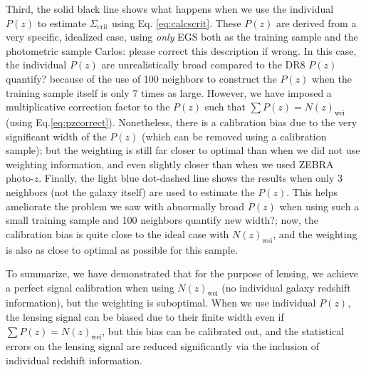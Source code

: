 \documentclass[preprint]{aastex}
\begin{document}
Third, the solid black line shows what happens when we use the individual
$P(z)$ to estimate $\Sigma_\mathrm{crit}$ using Eq. \ref{eq:calcscrit}.  These
$P(z)$ are derived from a very specific, idealized case, using {\em only} EGS
both as the training sample and the photometric sample {\color{red} Carlos:
please correct this description if wrong}.  In this case, the individual $P(z)$
are unrealistically broad compared to the DR8 $P(z)$ {\color{red}quantify?}
because of the use of 100 neighbors to construct the $P(z)$ when the training
sample itself is only $7$ times as large.  However, we have imposed a
multiplicative correction factor to the $P(z)$ such that $\sum P(z) =
N(z)_\mathrm{wei}$ (using Eq.\ref{eq:pzcorrect}).  Nonetheless, there is a
calibration bias due to the very significant width of the $P(z)$ (which can be
removed using a calibration sample); but the weighting is still far closer to
optimal than when we did not use weighting information, and even slightly
closer than when we used ZEBRA photo-$z$.  Finally, the light blue dot-dashed
line shows the results when only 3 neighbors (not the galaxy itself) are used
to estimate the $P(z)$.  This helps ameliorate the problem we saw with
abnormally broad $P(z)$ when using such a small training sample and 100
neighbors {\color{red} quantify new width?}; now, the calibration bias is quite
close to the ideal case with $N(z)_\mathrm{wei}$, and the weighting is also as
close to optimal as possible for this sample.

To summarize, we have demonstrated that for the purpose of lensing, we
achieve a perfect signal calibration when using $N(z)_\mathrm{wei}$
(no individual galaxy redshift information), but the weighting is
suboptimal.  When we use individual $P(z)$, the lensing signal can be
biased due to their finite width even if $\sum P(z) =
N(z)_\mathrm{wei}$, but this bias can be calibrated out, and the
statistical errors on the lensing signal are reduced significantly via
the inclusion of individual redshift information.
\end{document}
